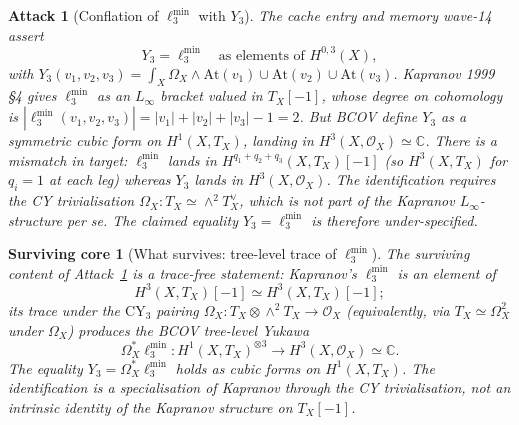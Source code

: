 \documentclass[11pt]{article}
\newtheorem{attack}[theorem]{Attack}
\newtheorem{surviving}[theorem]{Surviving core}
\providecommand{\At}{\mathrm{At}}
\providecommand{\CY}{\mathrm{CY}}
\providecommand{\Om}{\Omega}
\providecommand{\cO}{\mathcal{O}}
\providecommand{\CC}{\mathbb{C}}
\begin{document}
\begin{attack}[Conflation of $\ell_3^{\min}$ with $Y_3$]
\label{atk:1}
The cache entry and memory wave-14 assert
\[
  Y_3 = \ell_3^{\min} \quad \text{as elements of } H^{0,3}(X),
\]
with $Y_3(v_1, v_2, v_3) = \int_X \Om_X \wedge \At(v_1) \cup \At(v_2)
\cup \At(v_3)$. Kapranov 1999 \S4 gives $\ell_3^{\min}$ as an $L_\infty$
bracket valued in $T_X[-1]$, whose degree on cohomology is $|\ell_3^{\min}(v_1,
v_2, v_3)| = |v_1| + |v_2| + |v_3| - 1 = 2$. But BCOV \cite{BCOV1994} define
$Y_3$ as a \emph{symmetric} cubic form on $H^1(X, T_X)$, landing in
$H^3(X, \cO_X) \simeq \CC$. There is a mismatch in target: $\ell_3^{\min}$
lands in $H^{q_1 + q_2 + q_3}(X, T_X)[-1]$ (so $H^3(X, T_X)$ for $q_i = 1$
at each leg) whereas $Y_3$ lands in $H^3(X, \cO_X)$. The identification
requires the CY trivialisation $\Om_X: T_X \simeq \wedge^2 T_X^\vee$,
which is not part of the Kapranov $L_\infty$-structure per se. The
claimed equality $Y_3 = \ell_3^{\min}$ is therefore under-specified.
\end{attack}

\begin{surviving}[What survives: tree-level trace of $\ell_3^{\min}$]
\label{surv:1}
The surviving content of Attack~\ref{atk:1} is a \emph{trace-free}
statement: Kapranov's $\ell_3^{\min}$ is an element of
\[
  H^3(X, T_X)[-1] \simeq H^3(X, T_X)[-1];
\]
its trace under the $\CY_3$ pairing $\Om_X : T_X \otimes \wedge^2 T_X \to
\cO_X$ (equivalently, via $T_X \simeq \Om^2_X$ under $\Om_X$) produces
the BCOV tree-level Yukawa
\[
  \Om_X^* \ell_3^{\min} : H^1(X, T_X)^{\otimes 3} \to H^3(X, \cO_X) \simeq \CC.
\]
The equality $Y_3 = \Om_X^* \ell_3^{\min}$ holds as cubic forms on $H^1(X,
T_X)$. The identification is a specialisation of Kapranov through the CY
trivialisation, not an intrinsic identity of the Kapranov structure on
$T_X[-1]$.
\end{surviving}
\end{document}
